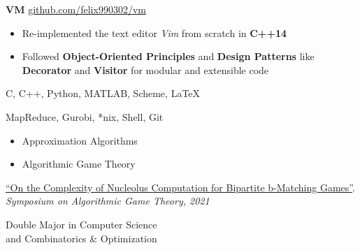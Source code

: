 \documentclass[11pt,a4paper]{altacv}
\begin{document}
\begin{paracol}{2}
\iffalse
\cvevent{Pleter}{}{May 2019}{\href{https://github.com/felix990302/word\_completion}{github.com/felix990302/word\_completion}}
\begin{itemize}
    \item Designed a concurrent auto-completion engine using a variation of \textbf{range trees} consisting of a \textbf{compressed trie} and sorted arrays in \textbf{C++}
    \item Accounted for race conditions and deadlocks using fine-grained read-write lock hierarchies
    \item Incorporated \textbf{gprof} as profiler for optimizations including a static \textbf{fixed-size allocator} to achieve \textbf{20x} speedup
\end{itemize}

\divider
\fi
\textbf{VM}
\hfill\href{https://github.com/felix990302/vm}{\faExternalLink* github.com/felix990302/vm}
\smallskip
\begin{itemize}
    \item Re-implemented the text editor \emph{Vim} from scratch in \textbf{C++14}
    \item Followed \textbf{Object-Oriented Principles} and \textbf{Design Patterns} like \textbf{Decorator} and \textbf{Visitor} for modular and extensible code
\end{itemize}

\switchcolumn

C, C++, Python, MATLAB, Scheme, \LaTeX

\smallskip

MapReduce, Gurobi, *nix, Shell, Git

\begin{itemize}
  \item Approximation Algorithms
  \item Algorithmic Game Theory
\end{itemize}

\href{https://arxiv.org/abs/2105.07161}{\faExternalLink* ``On the Complexity of Nucleolus Computation for Bipartite b-Matching Games''}.
\emph{Symposium on Algorithmic Game Theory, 2021}


Double Major in Computer Science\\
and Combinatorics \& Optimization


\end{paracol}
\end{document}
